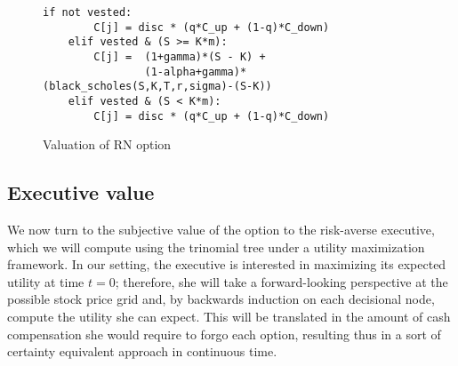 \begin{figure}
    \begin{lstlisting}[breaklines, basicstyle=\ttfamily\small] 
    if not vested:                         
        C[j] = disc * (q*C_up + (1-q)*C_down)
    elif vested & (S >= K*m):                
        C[j] =  (1+gamma)*(S - K) + 
                (1-alpha+gamma)*(black_scholes(S,K,T,r,sigma)-(S-K))
    elif vested & (S < K*m):  
        C[j] = disc * (q*C_up + (1-q)*C_down)
    \end{lstlisting}
    \caption{Valuation of RN option}
    \label{fig:val_r}
\end{figure}



\subsection{Executive value}



We now turn to the subjective value of the option to the risk-averse executive, which we will compute using the trinomial tree under a utility maximization framework. In our setting, the executive is interested in maximizing its expected utility at time $t=0$; therefore, she will take a forward-looking perspective at the possible stock price grid and, by backwards induction on each decisional node, compute the utility she can expect. This will be translated in the amount of cash compensation she would require to forgo each option, resulting thus in a sort of certainty equivalent approach in continuous time. 

